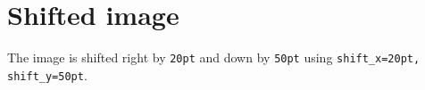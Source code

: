 \documentclass{article}
\begin{document}
\section*{Shifted image}

The image is shifted right by \texttt{20pt} and down by \texttt{50pt}
using \texttt{shift\_x=20pt, shift\_y=50pt}.

\lipsum[1-5]
\end{document}
